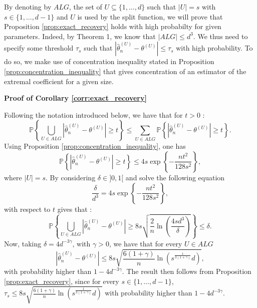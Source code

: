 \documentclass[11pt]{article}
\makeatletter
\renewenvironment{proof}[1][\proofname]{\par
\pushQED{\qed}%
\normalfont \topsep6\p@\@plus6\p@\relax
\trivlist
\item\relax
{\textbf{
#1\@addpunct{ }}}\hspace\labelsep\ignorespaces
}{%
\popQED\endtrivlist\@endpefalse
}
\makeatother
\begin{document}
	By denoting by $ALG$, the set of $U \subseteq \{1,\dots,d\}$ such that $|U| = s$ with $s \in \{1,\dots, d-1\}$ and $U$ is used by the split function, we will prove that Proposition \ref{prop:exact_recovery} holds with high probabilty for given parameters. Indeed, by Theorem 1, we know that $|ALG| \leq d^3$. We thus need to specify some threshold $\tau_s$ such that $|\hat{\theta}_n^{(U)} - \theta^{(U)}| \leq \tau_s$ with high probability. To do so, we make use of concentration inequality stated in Proposition \ref{prop:concentration_inequality} that gives concentration of an estimator of the extremal coefficient for a given size.
	
	\begin{proof}[Proof of Corollary \ref{corr:exact_recovery}]
		Following the notation introduced below, we have that for $t>0$ :
		\begin{equation*}
			\mathbb{P}\left\{ \bigcup_{U \in ALG} |\hat{\theta}_n^{(U)} - \theta^{(U)}| \geq t \right\} \leq \sum_{U \in ALG} \mathbb{P}\left\{|\hat{\theta}_n^{(U)} - \theta^{(U)}| \geq t \right\}.
		\end{equation*}
		Using Proposition \ref{prop:concentration_inequality}, one has 
		\begin{equation*}
			\mathbb{P}\left\{|\hat{\theta}_n^{(U)} - \theta^{(U)}| \geq t \right\} \leq 4 s \exp \left\{-\frac{nt^2}{128s^2} \right\},
		\end{equation*}
		where $|U| = s$. By considering $\delta \in ]0,1[$ and solve the following equation
		\begin{equation*}
			\frac{\delta}{d^3} = 4 s \exp \left\{-\frac{nt^2}{128s^2} \right\},
		\end{equation*}
		with respect to $t$ gives that :
		\begin{equation*}
			\mathbb{P}\left\{ \bigcup_{U \in ALG} |\hat{\theta}_n^{(U)} - \theta^{(U)}| \geq 8s \sqrt{\frac{2}{n} \ln \left( \frac{4 s d^3}{\delta} \right)} \right\} \leq \delta.
		\end{equation*}
		Now, taking $\delta = 4d^{-3\gamma}$, with $\gamma > 0$, we have that for every $U \in ALG$
		\begin{equation*}
			|\hat{\theta}_n^{(U)} - \theta^{(U)}| \leq 8s \sqrt{\frac{6(1+\gamma)}{n} \ln \left(s^{\frac{1}{3(1+\gamma)}} d \right)},
		\end{equation*}
		with probability higher than $1 - 
		4d^{-3\gamma}$. The result then follows from Proposition \ref{prop:exact_recovery}, since for every $s \in \{1, \dots, d-1\}$, $\tau_{s} \leq 8 s \sqrt{\frac{6(1+\gamma)}{n} \ln \left(s^{\frac{1}{3(1+\gamma)}} d \right)}$ with probability higher than $1-4d^{-3\gamma}$.
	\end{proof}
	
\end{document}
